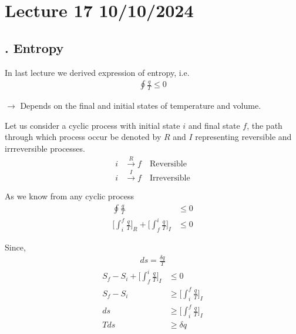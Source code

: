 \documentclass[fleqn,10pt]{SelfArx} %
\begin{document}
\section{Lecture 17 10/10/2024}

\subsection{. Entropy}
In last lecture we derived expression of entropy, i.e.
\begin{align*}
\oint \frac{q}{T} \leq 0 
\end{align*}

$\rightarrow$ Depends on the final and initial states of temperature and volume.

Let us consider a cyclic process with initial state $i$ and final state $f$, the path through which process occur be denoted by $R$ and $I$ representing reversible and irrreversible processes.
\begin{align*}
    i &\overset{R}{\longrightarrow} f \quad \text{Reversible} \\
    i &\overset{I}{\longrightarrow} f \quad \text{Irreversible}
\end{align*}

\begin{center}
\end{center}

As we know from any cyclic process
\begin{align}
    \oint \frac{q}{T} &\leq 0 \\
    \Big[\int^f_i \frac{q}{T}\Big]_R + \Big[\int^i_f \frac{q}{T}\Big]_I &\leq 0
\end{align}

Since, 
\begin{align}
    ds = \frac{\delta q}{T}
\end{align}
\begin{align}
    S_f - S_i + \Big[\int^i_f \frac{q}{T}\Big]_I &\leq 0 \\
    S_f - S_i &\geq \Big[\int^f_i \frac{q}{T}\Big]_I \\
    ds &\geq \Big[\int^f_i \frac{q}{T}\Big]_I \\
    Tds &\geq \delta q
\end{align}
\end{document}
